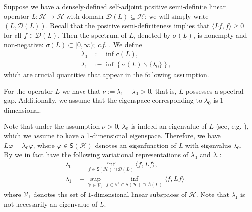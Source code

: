 \documentclass{aptpub}
\newcommand{\Dom}{\mathcal D}
\renewcommand{\H}{\mathcal H}
\begin{document}
Suppose we have a densely-defined self-adjoint positive semi-definite linear operator $L \colon \mathcal{H} \to \mathcal{H}$ with domain $\Dom(L) \subseteq \mathcal{H}$; we will simply write $(L, \Dom(L))$. Recall that the positive semi-definiteness implies that $\langle Lf,f\rangle \ge 0$ for all $f\in \Dom(L)$. Then the spectrum of $L$, denoted by $\sigma(L)$, is nonempty and non-negative: $\sigma(L) \subset [0,\infty)$; \textit{c.f.} \cite[Proposition 5.12]{Hislop1996}.
We define
\begin{equation*}
    \begin{split}
        \lambda_0 &:= \inf \sigma(L), \\
        \lambda_1 &:= \inf\left \{\sigma(L)\backslash \{\lambda_0\} \right \},
    \end{split}
\end{equation*}
which are crucial quantities that appear in the following assumption.
\begin{assumption}
	For the operator $L$ we have that $\nu := \lambda_1-\lambda_0 >0$, that is, $L$ possesses a spectral gap. Additionally, we assume that the eigenspace corresponding to $\lambda_0$ is $1$-dimensional.
    \label{assm:spec_gap}
\end{assumption}
Note that 
under the assumption $\nu>0$, $\lambda_0$ is indeed an eigenvalue of $L$ (see, e.g. \cite[Theorem 4.1]{Kulkarni2008}), which we assume to have a 1-dimensional eigenspace. Therefore, we have $L\varphi = \lambda_0 \varphi$, where $\varphi\in \mathsf S(\H)$ denotes an eigenfunction of $L$ with eigenvalue $\lambda_0$.
By \cite[Theorem XIII.1]{Reed1978} we in fact have 
the following variational representations of $\lambda_0$ and $\lambda_1$:
\begin{equation}
    \begin{split}
        \lambda_0 &= \inf_{f\in \mathsf S(\H)\cap \Dom(L)} \langle f,Lf\rangle,\\
        \lambda_1 &= 
       \sup_{\mathbb V \in \mathcal V_1} 
\inf_{f\in \mathbb{V}^\perp \cap \mathsf S(\H)\cap \Dom(L)} \langle f, Lf\rangle,
    \end{split}
    \label{eq:var_eigenv}
\end{equation}
where $\mathcal V_1$ denotes the set of $1$-dimensional linear subspaces of $\mathcal{H}$.
Note that $\lambda_1$ is not necessarily an eigenvalue of $L$.
\end{document}
